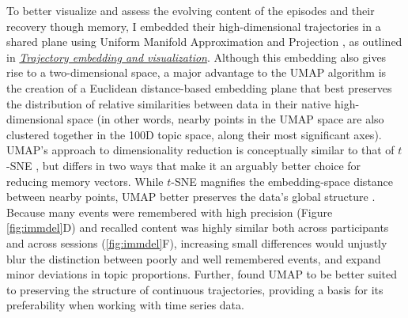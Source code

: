 \documentclass{article}
\begin{document}
To better visualize and assess the evolving content of the episodes and their recovery though memory, I embedded their high-dimensional trajectories in a shared plane using Uniform Manifold Approximation and Projection \citep[UMAP;][]{McInHeal18}, as outlined in \hyperref[sec:embedding]{\textit{Trajectory embedding and visualization}}.  Although this embedding also gives rise to a two-dimensional space, a major advantage to the UMAP algorithm is the creation of a Euclidean distance-based embedding plane that best preserves the distribution of relative similarities between data in their native high-dimensional space (in other words, nearby points in the UMAP space are also clustered together in the 100D topic space, along their most significant axes).  UMAP's approach to dimensionality reduction is conceptually similar to that of $t$-SNE \citep[$t$-distributed Stochastic Neighbor Embedding;][]{MaatHint08} , but differs in two ways that make it an arguably better choice for reducing memory vectors.  While $t$-SNE magnifies the embedding-space distance between nearby points, UMAP better preserves the data's global structure \citep{BechEtal19}.  Because many events were remembered with high precision (Figure \ref{fig:immdel}D) and recalled content was highly similar both across participants and across sessions (\ref{fig:immdel}F), increasing small differences would unjustly blur the distinction between poorly and well remembered events, and expand minor deviations in topic proportions.  Further, \cite{BechEtal19} found UMAP to be better suited to preserving the structure of continuous trajectories, providing a basis for its preferability when working with time series data.
\end{document}
